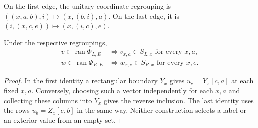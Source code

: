 \begin{definition}
    \label{def:mpo_joint_edge_regrouping}
    \leanok
    On the first edge, the unitary coordinate regrouping is
    $((x,a,b),i)\mapsto(x,(b,i),a)$. On the last edge, it is
    $(i,(x,c,e))\mapsto(x,(i,c),e)$.
\end{definition}

\begin{lemma}
    \label{thm:mpo_joint_core_edge_fibers}
    \leanok
    Under the respective regroupings,
    \begin{align}
        v\in\operatorname{ran}\Phi_{L,E}
         & \iff v_{x,a}\in S_{L,x}\text{ for every }x,a, \\
        w\in\operatorname{ran}\Phi_{R,E}
         & \iff w_{x,e}\in S_{R,x}\text{ for every }x,e.
    \end{align}
\end{lemma}
\begin{proof}
    \leanok
    In the first identity a rectangular boundary $Y_x$ gives
    $u_c=Y_x[c,a]$ at each fixed $x,a$. Conversely, choosing such a
    vector independently for each $x,a$ and collecting these columns
    into $Y_x$ gives the reverse inclusion.
    The last identity uses the rows $u_b=Z_x[e,b]$ in the same way.
    Neither construction selects a label or an exterior value from an
    empty set.
\end{proof}

